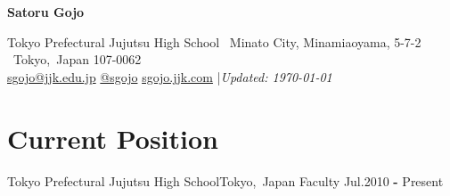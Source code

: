 \documentclass{OpenCV}
\newlength{\hvspace}
\begin{document}
\begin{center}
    \noindent\textbf{\LARGE Satoru Gojo} \\
\end{center}
\vspace{\hvspace}
\hrulefill
\vspace{\hvspace}
\begin{center}
    \noindent Tokyo Prefectural Jujutsu High School \textbullet\ Minato City, Minamiaoyama, 5-7-2 \textbullet\ Tokyo,\, Japan 107-0062 \\
    \noindent\faEnvelopeO\enskip \href{mailto:sgojo@jjk.edu.jp}{sgojo@jjk.edu.jp}\enskip
    \faTwitter\enskip\href{https://en.wikipedia.org/wiki/Jujutsu_Kaisen}{@sgojo}\enskip
    \faGlobe\enskip\href{https://en.wikipedia.org/wiki/Jujutsu_Kaisen}{sgojo.jjk.com}\enskip
    |\enskip \textit{Updated: \today} \\
\end{center}
\vspace{\hvspace}
\vspace{-4pt}
\hrulefill
\vspace{-12pt}

\section*{Current Position}
\resumeSubHeadingListStart

\resumeSubheading
{Tokyo Prefectural Jujutsu High School}{Tokyo,\, Japan}
{Faculty}
{Jul.\@ 2010 \textbf{-} Present} 

\resumeSubHeadingListEnd






\end{document}
